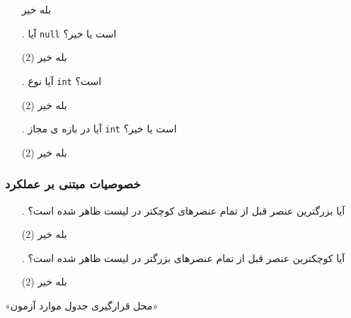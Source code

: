 \documentclass[twoside]{article}
\newenvironment{answer}{}{\medskip}
\begin{document}
\begin{answer}
\begin{enumerate}
\begin{tasks}
		\task[\lr{1}. ] بله
		\task[\lr{2}. ] خیر
	\end{tasks}
	\item[\lr{\textbf{G}}.]
آیا  \texttt{null} است یا خیر؟
	\begin{tasks}(2)
		\task[\lr{1}. ] بله
		\task[\lr{2}. ] خیر
	\end{tasks}
	\item[\lr{\textbf{H}}.]
آیا  نوع \texttt{int} است؟
	\begin{tasks}(2)
		\task[\lr{1}. ] بله
		\task[\lr{2}. ] خیر
	\end{tasks}
	\item[\lr{\textbf{I}}.]
آیا  در بازه ی مجاز \texttt{int} است یا خیر؟
	\begin{tasks}(2)
		\task[\lr{1}. ] بله
		\task[\lr{2}. ] خیر
	\end{tasks}
\end{enumerate}
\subsubsection*{خصوصیات مبتنی بر عملکرد}
\begin{enumerate}
	\item[\lr{\textbf{J}}.]
آیا بزرگترین عنصر قبل از تمام عنصرهای کوچکتر در لیست ظاهر شده است؟
	\begin{tasks}(2)
		\task[\lr{1}. ] بله
		\task[\lr{2}. ] خیر
	\end{tasks}
	\item[\lr{\textbf{K}}.]
آیا کوچکترین عنصر قبل از تمام عنصرهای بزرگتر در لیست ظاهر شده است؟
	\begin{tasks}(2)
		\task[\lr{1}. ] بله
		\task[\lr{2}. ] خیر
	\end{tasks}
\end{enumerate}

\begin{center}
«محل قرارگیری جدول موارد ‌آزمون»
\end{center}
\end{answer}
\end{document}
